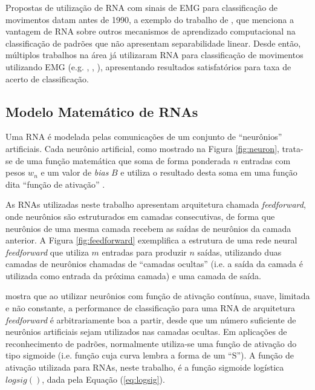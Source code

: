 Propostas de utilização de RNA com sinais de EMG para classificação de movimentos datam antes de 1990, a exemplo do trabalho de , que menciona a vantagem de RNA sobre outros mecanismos de aprendizado computacional na classificação de padrões que não apresentam separabilidade linear. Desde então, múltiplos trabalhos na área já utilizaram RNA para classificação de movimentos utilizando EMG (e.g. , , ), apresentando resultados satisfatórios para taxa de acerto de classificação.

			\subsection{Modelo Matemático de RNAs}

Uma RNA é modelada pelas comunicações de um conjunto de ``neurônios'' artificiais. Cada neurônio artificial, como mostrado na Figura \ref{fig:neuron}, trata-se de uma função matemática que soma de forma ponderada $n$ entradas com pesos $w_n$ e um valor de \emph{bias} $B$ e utiliza o resultado desta soma em uma função dita ``função de ativação'' \cite{Tanikic2012}.



As RNAs utilizadas neste trabalho apresentam arquitetura chamada \emph{feedforward}, onde neurônios são estruturados em camadas consecutivas, de forma que neurônios de uma mesma camada recebem as saídas de neurônios da camada anterior. A Figura \ref{fig:feedforward} exemplifica a estrutura de uma rede neural \emph{feedforward} que utiliza $m$ entradas para produzir $n$ saídas, utilizando duas camadas de neurônios chamadas de ``camadas ocultas'' (i.e. a saída da camada é utilizada como entrada da próxima camada) e uma camada de saída.



 mostra que ao utilizar neurônios com função de ativação contínua, suave, limitada e não constante, a performance de classificação para uma RNA de arquitetura \emph{feedforward} é arbitrariamente boa a partir, desde que um número suficiente de neurônios artificiais sejam utilizados nas camadas ocultas. Em aplicações de reconhecimento de padrões, normalmente utiliza-se uma função de ativação do tipo sigmoide (i.e. função cuja curva lembra a forma de um ``S'').  A função de ativação utilizada para RNAs, neste trabalho, é a função sigmoide logística $logsig()$, dada pela Equação (\ref{eq:logsig}).

